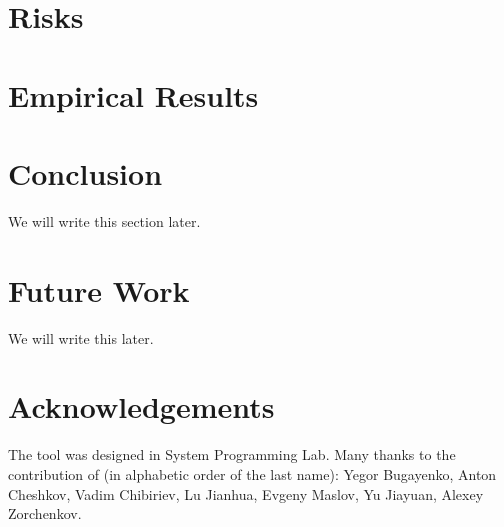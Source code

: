 \documentclass[12pt]{article}
\begin{document}
\section{Risks}
\label{sec:risks}


% 

\section{Empirical Results}
\label{sec:results}


\section{Conclusion}
We will write this section later.

\section{Future Work}
We will write this later.

\section{Acknowledgements}
The tool was designed in System Programming Lab. Many thanks
to the contribution of (in alphabetic order of the last name):
Yegor Bugayenko,
Anton Cheshkov,
Vadim Chibiriev,
Lu Jianhua,
Evgeny Maslov,
Yu Jiayuan,
Alexey Zorchenkov.

%


\end{document}
